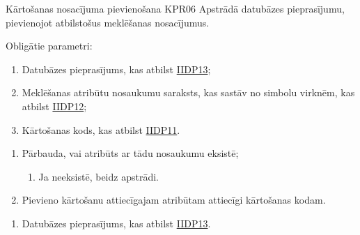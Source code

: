 \procedureTable
{Kārtošanas nosacījuma pievienošana}
{KPR06}
{
	Apstrādā datubāzes pieprasījumu, pievienojot atbilstošus meklēšanas nosacījumus.
}
{
	Obligātie parametri:
	\begin{enumerate}
		\item Datubāzes pieprasījums, kas atbilst \hyperref[tab:IIDP13]{IIDP13};
		\item Meklēšanas atribūtu nosaukumu saraksts, kas sastāv no simbolu virknēm, kas atbilst \hyperref[tab:IIDP12]{IIDP12};
		\item Kārtošanas kods, kas atbilst \hyperref[tab:IIDP11]{IIDP11}.
	\end{enumerate}
}
{
	\begin{enumerate}
		\item Pārbauda, vai atribūts ar tādu nosaukumu eksistē;
		      \begin{enumerate}
			      \item Ja neeksistē, beidz apstrādi.
		      \end{enumerate}
		\item Pievieno kārtošanu attiecīgajam atribūtam attiecīgi kārtošanas kodam.
	\end{enumerate}
}
{
	\begin{enumerate}
		\item Datubāzes pieprasījums, kas atbilst \hyperref[tab:IIDP13]{IIDP13}.
	\end{enumerate}
}

